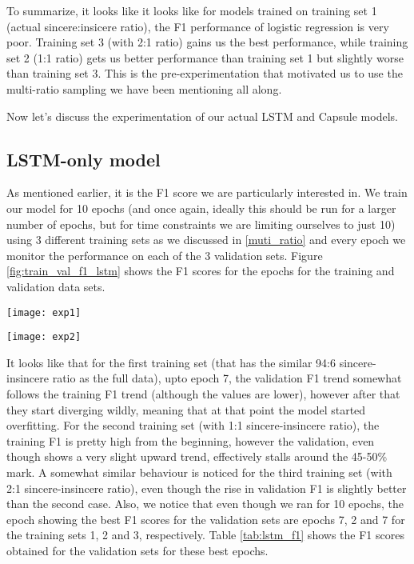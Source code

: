 \documentclass[11pt,twocolumn,letterpaper]{article}
\begin{document}
To summarize, it looks like it looks like for models trained on training set 1 (actual sincere:insicere ratio), the F1 performance of logistic regression is very poor. Training set 3 (with 2:1 ratio) gains us the best performance, while training set 2 (1:1 ratio) gets us better performance than training set 1 but slightly worse than training set 3. This is the pre-experimentation that motivated us to use the multi-ratio sampling we have been mentioning all along.

Now let's discuss the experimentation of our actual LSTM and Capsule models.

\subsection{LSTM-only model}

As mentioned earlier, it is the F1 score we are particularly interested in. We train our model for 10 epochs (and once again, ideally this should be run for a larger number of epochs, but for time constraints we are limiting ourselves to just 10) using 3 different training sets as we discussed in \ref{muti_ratio} and every epoch we monitor the performance on each of the 3 validation sets. Figure \ref{fig:train_val_f1_lstm} shows the F1 scores for the epochs for the training and validation data sets.

\begin{figure*}[h]
\texttt{[image: exp1]}
\caption{Training and Valdation F1 Score Performance for LSTM-only model}
\label{fig:train_val_f1_lstm}
\centering
\end{figure*}

\begin{figure*}[!htbp]
\texttt{[image: exp2]}
\caption{Training and Valdation F1 Score Performance for LSTM with Capsule model}
\label{fig:train_val_f1_capsule}
\centering
\end{figure*}

It looks like that for the first training set (that has the similar 94:6 sincere-insincere ratio as the full data), upto epoch 7, the validation F1 trend somewhat follows the training F1 trend (although the values are lower), however after that they start diverging wildly, meaning that at that point the model started overfitting. For the second training set (with 1:1 sincere-insincere ratio), the training F1 is pretty high from the beginning, however the validation, even though shows a very slight upward trend, effectively stalls around the 45-50\% mark. A somewhat similar behaviour is noticed for the third training set (with 2:1 sincere-insincere ratio), even though the rise in validation F1 is slightly better than the second case. Also, we notice that even though we ran for 10 epochs, the epoch showing the best F1 scores for the validation sets are epochs 7, 2 and 7 for the training sets 1, 2 and 3, respectively. Table \ref{tab:lstm_f1} shows the F1 scores obtained for the validation sets for these best epochs.
\end{document}
